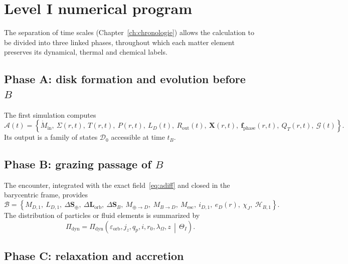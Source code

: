 \documentclass[11pt,a4paper,openany]{report}
\begin{document}
\chapter{Level I numerical program}
\label{ch:programme}

The separation of time scales (Chapter~\ref{ch:chronologie}) allows the calculation to be divided
into three linked phases, throughout which each matter element preserves its dynamical, thermal and
chemical labels.

\section{Phase A: disk formation and evolution before \texorpdfstring{$B$}{B}}

The first simulation computes
\begin{equation}
\mathcal{A}(t)=\left\{\dot M_{\mathrm{in}},\ \Sigma(r,t),\ T(r,t),\ P(r,t),\ L_D(t),\
R_{\mathrm{out}}(t),\ \mathbf{X}(r,t),\ \mathbf{f}_{\mathrm{phase}}(r,t),\ Q_T(r,t),\ \mathcal{G}(t)\right\}.
\label{eq:phaseA}
\end{equation}
Its output is a family of states $\mathcal{D}_0$ accessible at time $t_B$.

\section{Phase B: grazing passage of \texorpdfstring{$B$}{B}}

The encounter, integrated with the exact field~\eqref{eq:adiff} and closed in the barycentric frame,
provides
\begin{equation}
\mathcal{B}=\left\{M_{D,1},\ L_{D,1},\ \Delta\mathbf{S}_\oplus,\ \Delta\mathbf{L}_{\mathrm{orb}},\
\Delta\mathbf{S}_B,\ M_{\oplus\to D},\ M_{B\to D},\ M_{\mathrm{esc}},\ i_{D,1},\ e_D(r),\ \chi_J,\ \mathcal{H}_{B,1}\right\}.
\label{eq:phaseB}
\end{equation}
The distribution of particles or fluid elements is summarized by
\begin{equation}
\Pi_{\mathrm{dyn}}=\Pi_{\mathrm{dyn}}\left(\varepsilon_{\mathrm{orb}},j_z,q_p,i,r_0,\lambda_\Omega,z
\,\middle|\,\Theta_I\right).
\label{eq:Pidyn}
\end{equation}

\section{Phase C: relaxation and accretion}
\end{document}
